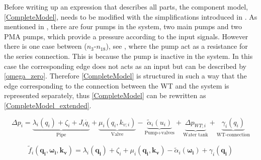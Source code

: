 Before writing up an expression that describes all parts, the component model, \eqref{CompleteModel}, needs to be modified with the simplifications introduced in . As mentioned in , there are four pumps in the system, two main pumps and two PMA pumps, which provide a pressure according to the input signals. However there is one case between ($n_3$-$n_{18}$), see , where the pump act as a resistance for the series connection. This is because the pump is inactive in the system. In this case the corresponding edge does not acts as an input but can be described by \eqref{omega_zero}. Therefore \eqref{CompleteModel} is structured in such a way that the edge corresponding to the connection between the WT and the system is represented separately, thus \eqref{CompleteModel} can be rewritten as  \eqref{CompleteModel_extended}.


\begin{equation}
\label{CompleteModel_extended}
\Delta p_i = \underbrace{\lambda_i (q_i) + \zeta_i + J_i \dot{q_i}}_\text{Pipe} + \underbrace{\mu_i (q_i, k_{v;i})}_\text{Valve} - \underbrace{\tilde{\alpha}_i(u_i)}_\text{Pump+valves} + \underbrace{\Delta p_{WT;i}}_\text{Water tank} + \underbrace{\gamma_i (q_i)}_\text{WT-connection}
\end{equation}


\begin{equation}
  \tilde{f}_i(\bm{q_{i}}, \bm{\omega_i}, \bm{k_v}) = \lambda_i(\bm{q_{i}}) + \zeta_i + \mu_i(\bm{q_{i}}, \bm{k_v}) - \tilde{\alpha}_i(\bm{\omega_i}) + \gamma_i (\bm{q_i})
  \label{ComponentFunction}
\end{equation}


